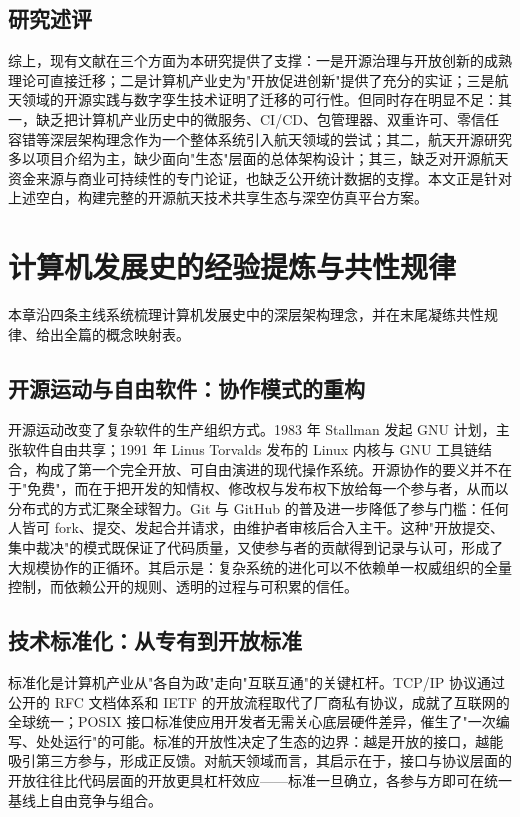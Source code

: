 \documentclass[UTF8,a4paper,zihao=-4]{ctexart}
\begin{document}
\subsection{研究述评}
综上，现有文献在三个方面为本研究提供了支撑：一是开源治理与开放创新的成熟理论可直接迁移；二是计算机产业史为"开放促进创新"提供了充分的实证；三是航天领域的开源实践与数字孪生技术证明了迁移的可行性。但同时存在明显不足：其一，缺乏把计算机产业历史中的微服务、CI/CD、包管理器、双重许可、零信任容错等深层架构理念作为一个整体系统引入航天领域的尝试；其二，航天开源研究多以项目介绍为主，缺少面向"生态"层面的总体架构设计；其三，缺乏对开源航天资金来源与商业可持续性的专门论证，也缺乏公开统计数据的支撑。本文正是针对上述空白，构建完整的开源航天技术共享生态与深空仿真平台方案。

\section{计算机发展史的经验提炼与共性规律}
本章沿四条主线系统梳理计算机发展史中的深层架构理念，并在末尾凝练共性规律、给出全篇的概念映射表。

\subsection{开源运动与自由软件：协作模式的重构}
开源运动改变了复杂软件的生产组织方式。1983 年 Stallman 发起 GNU 计划，主张软件自由共享\cite{stallman1985}；1991 年 Linus Torvalds 发布的 Linux 内核与 GNU 工具链结合，构成了第一个完全开放、可自由演进的现代操作系统\cite{raymond1999}。开源协作的要义并不在于"免费"，而在于把开发的知情权、修改权与发布权下放给每一个参与者，从而以分布式的方式汇聚全球智力。Git 与 GitHub 的普及进一步降低了参与门槛：任何人皆可 fork、提交、发起合并请求，由维护者审核后合入主干\cite{git}。这种"开放提交、集中裁决"的模式既保证了代码质量，又使参与者的贡献得到记录与认可，形成了大规模协作的正循环。其启示是：复杂系统的进化可以不依赖单一权威组织的全量控制，而依赖公开的规则、透明的过程与可积累的信任。

\subsection{技术标准化：从专有到开放标准}
标准化是计算机产业从"各自为政"走向"互联互通"的关键杠杆。TCP/IP 协议通过公开的 RFC 文档体系和 IETF 的开放流程取代了厂商私有协议\cite{rfc2026}，成就了互联网的全球统一；POSIX 接口标准使应用开发者无需关心底层硬件差异，催生了"一次编写、处处运行"的可能\cite{posix2017}。标准的开放性决定了生态的边界：越是开放的接口，越能吸引第三方参与，形成正反馈。对航天领域而言，其启示在于，接口与协议层面的开放往往比代码层面的开放更具杠杆效应——标准一旦确立，各参与方即可在统一基线上自由竞争与组合。
\end{document}
